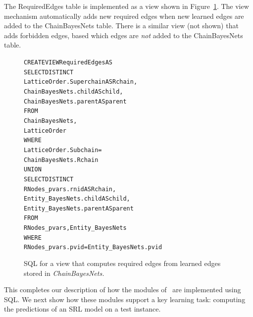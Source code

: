  The RequiredEdges table is implemented as a view shown in Figure~\ref{fig:required-edges}. The view mechanism automatically adds new required edges when new learned edges are added to the ChainBayesNets table. There is a similar view (not shown) that adds forbidden edges, based which edges are    \emph{not} added to the ChainBayesNets table.

\begin{figure}
\begin{alltt}
CREATE VIEW RequiredEdges AS
	SELECT DISTINCT
        LatticeOrder.Superchain AS Rchain,
        ChainBayesNets.child AS child,
        ChainBayesNets.parent AS parent
	FROM
        ChainBayesNets,
        LatticeOrder
	WHERE
       LatticeOrder.Subchain = 
       ChainBayesNets.Rchain
UNION
       SELECT DISTINCT
        RNodes\_pvars.rnid AS Rchain,
        Entity\_BayesNets.child AS child,
        Entity\_BayesNets.parent AS parent	
        FROM
        RNodes\_pvars, Entity\_BayesNets
        WHERE
        RNodes\_pvars.pvid = Entity\_BayesNets.pvid
  \end{alltt}
  \caption{SQL for a view that computes required edges from learned edges stored in \it{ChainBayesNets}.}
  \label{fig:required-edges}
 \end{figure}

This completes our description of how the modules of \FB\ are implemented using SQL. We next show how these modules support a key learning task: computing the predictions of an SRL model on a test instance. 

